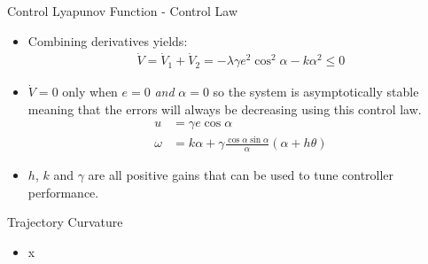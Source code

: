 \documentclass[hyperref={pdfpagelabels=false}]{beamer}
\begin{document}
\begin{frame}{Control Lyapunov Function - Control Law}
\begin{itemize}
\item Combining derivatives yields:
\begin{align*}
\dot{V} = \dot{V}_1 + \dot{V}_2 = -\lambda\gamma e^2\cos^2\alpha - k\alpha^2 \leq 0
\end{align*}
\item $\dot{V}=0$ only when $e=0$ \textit{and} $\alpha=0$ so the system is asymptotically stable meaning that the errors will always be decreasing using this control law.
\begin{align*}
u &= \gamma e\cos\alpha \\
\omega &= k\alpha + \gamma\frac{\cos\alpha\sin\alpha}{\alpha}\left(\alpha+h\theta\right)
\end{align*}
\item $h$, $k$ and $\gamma$ are all positive gains that can be used to tune controller performance.
\end{itemize}
\end{frame}

\begin{frame}{Trajectory Curvature}
\begin{itemize}
\item x
\end{itemize}
\end{frame}
\end{document}
